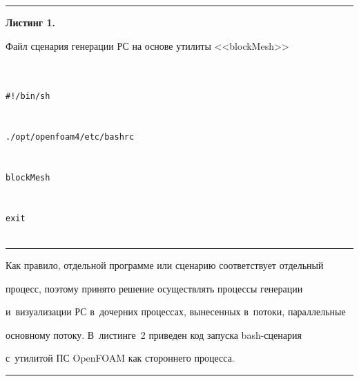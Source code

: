 \hrule





\vspace*{3pt}





\noindent


\textbf{Листинг 1.} {\small


Файл сценария генерации РС на основе утилиты <<blockMesh>>}


{\small \begin{verbatim}


#!/bin/sh


./opt/openfoam4/etc/bashrc


blockMesh


exit


\end{verbatim}


}





\vspace*{3pt}





\hrule





\vspace*{6pt}








  Как правило, отдельной программе или сценарию соответствует отдельный 


процесс, поэтому принято решение осуществлять процессы генерации 


и~визуализации РС в~дочерних процессах, вынесенных в~потоки, параллельные 


основному потоку. В~листинге~2 приведен код запуска bash-сце\-на\-рия 


с~утилитой ПС OpenFOAM как стороннего процесса. 





\medskip







\hrule





